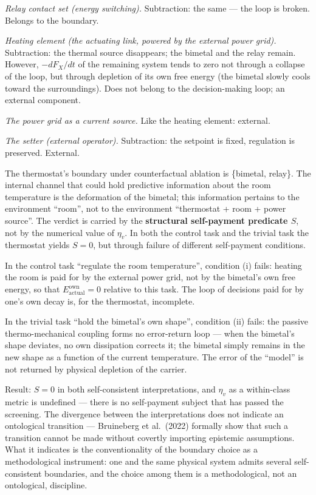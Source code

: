 \documentclass[pdflatex,sn-mathphys-ay]{sn-jnl}
\begin{document}
\emph{Relay contact set (energy switching).} Subtraction: the same --- the loop is broken. Belongs to the boundary.

\emph{Heating element (the actuating link, powered by the external power grid).} Subtraction: the thermal source disappears; the bimetal and the relay remain. However, \(-dF_X/dt\) of the remaining system tends to zero not through a collapse of the loop, but through depletion of its own free energy (the bimetal slowly cools toward the surroundings). Does not belong to the decision-making loop; an external component.

\emph{The power grid as a current source.} Like the heating element: external.

\emph{The setter (external operator).} Subtraction: the setpoint is fixed, regulation is preserved. External.

The thermostat's boundary under counterfactual ablation is \{bimetal, relay\}. The internal channel that could hold predictive information about the room temperature is the deformation of the bimetal; this information pertains to the environment ``room'', not to the environment ``thermostat + room + power source''. The verdict is carried by the \textbf{structural self-payment predicate \(S\)}, not by the numerical value of \(\eta_v\). In both the control task and the trivial task the thermostat yields \(S = 0\), but through failure of different self-payment conditions.

In the control task ``regulate the room temperature'', condition (i) fails: heating the room is paid for by the external power grid, not by the bimetal's own free energy, so that \(E_{\text{actual}}^{\text{own}} = 0\) relative to this task. The loop of decisions paid for by one's own decay is, for the thermostat, incomplete.

In the trivial task ``hold the bimetal's own shape'', condition (ii) fails: the passive thermo-mechanical coupling forms no error-return loop --- when the bimetal's shape deviates, no own dissipation corrects it; the bimetal simply remains in the new shape as a function of the current temperature. The error of the ``model'' is not returned by physical depletion of the carrier.

Result: \(S = 0\) in both self-consistent interpretations, and \(\eta_v\) as a within-class metric is undefined --- there is no self-payment subject that has passed the screening. The divergence between the interpretations does not indicate an ontological transition --- Bruineberg et al.~(2022) formally show that such a transition cannot be made without covertly importing epistemic assumptions. What it indicates is the conventionality of the boundary choice as a methodological instrument: one and the same physical system admits several self-consistent boundaries, and the choice among them is a methodological, not an ontological, discipline.
\end{document}
